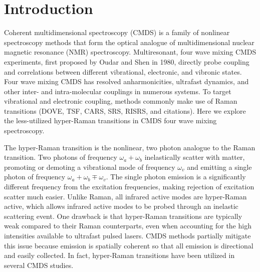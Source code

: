 \documentclass[aip, jcp, reprint, onecolumn]{revtex4-2}
\begin{document}
\maketitle

\section{Introduction}
Coherent multidimensional spectroscopy (CMDS) is a family of nonlinear spectroscopy methods that form the optical analogue of multidimensional nuclear magnetic resonance (NMR) spectroscopy.\cite{Cho2008}
Multiresonant, four wave mixing CMDS experiments, first proposed by Oudar and Shen in 1980,\cite{RN307} directly probe coupling and correlations between different vibrational, electronic, and vibronic states. \cite{RN281, RN103, Cho2008} 
Four wave mixing CMDS has resolved anharmonicities, ultrafast dynamics, and other inter- and intra-molecular couplings in numerous systems. \cite{Cho2008, Gaynor2017, Ziegler2018, Ogilvie2019, Bonn2021, RN325}
To target vibrational and electronic coupling, methods commonly make use of Raman transitions (DOVE, TSF, CARS, SRS, RISRS, and citations).
Here we explore the less-utilized hyper-Raman transitions in CMDS four wave mixing spectroscopy.

The hyper-Raman transition is the nonlinear, two photon analogue to the Raman transition.\cite{Terhune1965, Cyvin1965, Andrews1978}
Two photons of frequency $\omega_a+\omega_b$ inelastically scatter with matter, promoting or demoting a vibrational mode of frequency $\omega_v$ and emitting a single photon of frequency $\omega_a + \omega_b \mp \omega_v$.
The single photon emission is a significantly different frequency from the excitation frequencies, making rejection of excitation scatter much easier.
Unlike Raman, all infrared active modes are hyper-Raman active, which allows infrared active modes to be probed through an inelastic scattering event. \cite{Andrews1978}
One drawback is that hyper-Raman transitions are typically weak compared to their Raman counterparts, even when accounting for the high intensities available to ultrafast pulsed lasers.\cite{RN515, Kelley2010}
CMDS methods partially mitigate this issue because emission is spatially coherent so that all emission is directional and easily collected.
In fact, hyper-Raman transitions have been utilized in several CMDS studies.\cite{Zilian1994, RN350, RN416, RN351, RN352, RN353, Chen1998, RN362, RN418, Bonn2024, McDonnell2024,Wang2021}
\end{document}
